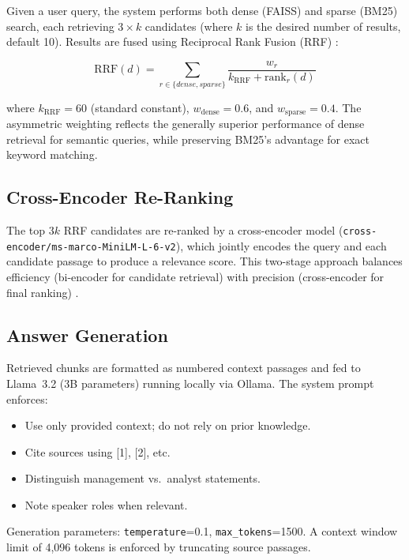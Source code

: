 \documentclass[12pt,a4paper]{article}
\begin{document}
Given a user query, the system performs both dense (FAISS) and sparse (BM25) search, each retrieving $3 \times k$ candidates (where $k$ is the desired number of results, default 10). Results are fused using Reciprocal Rank Fusion (RRF) \citep{cormack2009reciprocal}:

\begin{equation}
    \text{RRF}(d) = \sum_{r \in \{dense, sparse\}} \frac{w_r}{k_{\text{RRF}} + \text{rank}_r(d)}
    \label{eq:rrf}
\end{equation}

where $k_{\text{RRF}} = 60$ (standard constant), $w_{\text{dense}} = 0.6$, and $w_{\text{sparse}} = 0.4$. The asymmetric weighting reflects the generally superior performance of dense retrieval for semantic queries, while preserving BM25's advantage for exact keyword matching.

\subsection{Cross-Encoder Re-Ranking}

The top $3k$ RRF candidates are re-ranked by a cross-encoder model (\texttt{cross-encoder/ms-marco-MiniLM-L-6-v2}), which jointly encodes the query and each candidate passage to produce a relevance score. This two-stage approach balances efficiency (bi-encoder for candidate retrieval) with precision (cross-encoder for final ranking) \citep{nogueira2019passage}.

\subsection{Answer Generation}

Retrieved chunks are formatted as numbered context passages and fed to Llama~3.2 (3B parameters) running locally via Ollama. The system prompt enforces:
\begin{itemize}[noitemsep]
    \item Use only provided context; do not rely on prior knowledge.
    \item Cite sources using [1], [2], etc.
    \item Distinguish management vs.\ analyst statements.
    \item Note speaker roles when relevant.
\end{itemize}

Generation parameters: \texttt{temperature}=0.1, \texttt{max\_tokens}=1500. A context window limit of 4,096 tokens is enforced by truncating source passages.
\end{document}
